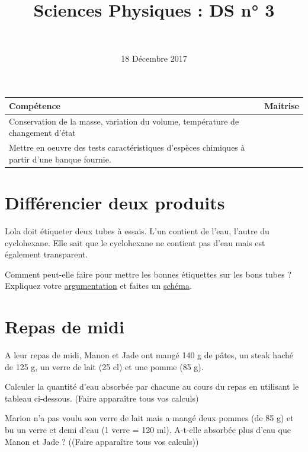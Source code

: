 \documentclass[a4paper,11pt]{exam}
\author{\ }
\date{18 Décembre 2017}
\title{Sciences Physiques : DS n° 3}
\begin{document}
%	

	\maketitle
	
	


\begin{small}
	\begin{center}
		\begin{tabular}{|@{\ }l@{}|@{\ }c@{\ }|}
			\hline
			\textbf{Compétence} & \textbf{Maitrise} \\
			\hline
			Conservation de la masse, variation du volume, température de changement d’état &  \ \ \ \\
			\hline
			Mettre en oeuvre des tests caractéristiques d’espèces chimiques à partir d’une banque fournie. &  \\
			\hline			
		\end{tabular}
	\end{center}
\end{small}	

\section{Différencier deux produits}

Lola doit étiqueter deux tubes à essais. L'un contient de l'eau, l'autre du cyclohexane. Elle sait que le cyclohexane ne contient pas d'eau mais est également transparent.

\begin{questions}
	\question Comment peut-elle faire pour mettre les bonnes étiquettes sur les bons tubes ? Expliquez votre \underline{argumentation} et faites un \underline{schéma}.
\end{questions}


\section{Repas de midi}

A leur repas de midi, Manon et Jade ont mangé 140 g de pâtes, un steak haché de 125 g, un verre de lait (25 cl) et une pomme (85 g).


\begin{questions}
	\question Calculer la quantité d'eau absorbée par chacune au cours du repas en utilisant le tableau ci-dessous. (Faire apparaître tous vos calculs)
	
	\question Marion n'a pas voulu son verre de lait mais a mangé deux pommes (de 85 g) et bu un verre et demi d'eau (1 verre = 120 ml). A-t-elle absorbée plus d'eau que Manon et Jade ? ((Faire apparaître tous vos calculs))
\end{questions}
\end{document}
